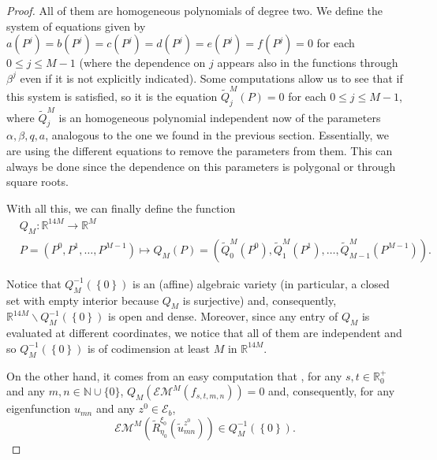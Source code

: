 \documentclass{amsart}
\theoremstyle{definition}
\theoremstyle{remark}
\renewcommand\leq\leqslant
\numberwithin{equation}{section}
\theoremstyle{definition}
\theoremstyle{remark}
\begin{document}
\begin{proof}
	All of them are homogeneous polynomials of degree two. We define the system of equations given by $a(P^j)=b(P^j)=c(P^j)=d(P^j)=e(P^j)=f(P^j)=0$ for each $0\leq j\leq M-1$ (where the dependence on $j$ appears also in the functions through $\beta^j$ even if it is not explicitly indicated). Some computations allow us to see that if this system is satisfied, so it is the equation $\tilde{Q}_j^M(P)=0$ for each $0\leq j\leq M-1$, where $\tilde{Q}_j^M$ is an homogeneous polynomial independent now of the parameters $\alpha,\beta,q,a$, analogous to the one we found in the previous section. Essentially, we are using the different equations to remove the parameters from them. This can always be done since the dependence on this parameters is polygonal or through square roots. 
    
      With all this, we can finally define the function\begin{equation}
        \begin{aligned}
            &Q_M:\mathbb{R}^{14M}\rightarrow\mathbb{R}^{M}\\
            &P=(P^0,P^1,\ldots,P^{M-1})\mapsto Q_M(P)=\left(\tilde{Q}^M_0\left(P^0\right), \tilde{Q}^M_1\left(P^1\right),\ldots,\tilde{Q}^M_{M-1}\left(P^{M-1}\right)\right).
        \end{aligned}
    \end{equation}
	 
      Notice that $Q_M^{-1}\left(\left\{0\right\}\right)$ is an (affine) algebraic variety (in particular, a closed set with empty interior because $Q_M$ is surjective) and, consequently, $\mathbb{R}^{14M}\backslash Q_M^{-1}\left(\left\{0\right\}\right)$ is open and dense.  Moreover, since any entry of $Q_M$ is evaluated at different coordinates, we notice that all of them are independent and so $Q_M^{-1}\left(\left\{0\right\}\right)$ is of codimension at least $M$ in $\mathbb{R}^{14M}$. 

       On the other hand, it comes from an easy computation that , for any $s,t\in\mathbb{R}^+_0$ and any $m,n\in\mathbb{N}\cup\{0\}$, $Q_M\left(\mathcal{EM}^M\left(f_{s,t,m,n}\right)\right)=0$ and, consequently, for any eigenfunction $u_{mn}$ and any $z^0\in\mathcal{E}_b$,
	\begin{equation}
		\mathcal{EM}^M\left(\tilde{R}_{\eta_0}^{\xi_0}\left(\tilde{u}_{mn}^{z^0}\right)\right)\in Q_M^{-1}\left(\left\{0\right\}\right).
	\end{equation}
    

\end{proof}
\end{document}
